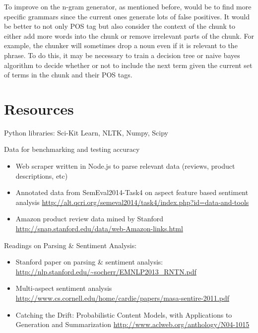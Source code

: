 \documentclass{article}
\begin{document}
To improve on the n-gram generator, as mentioned before, would be to find more specific grammars since the current ones generate lots of false positives. It would be better to not only POS tag but also consider the context of the chunk to either add more words into the chunk or remove irrelevant parts of the chunk. For example, the chunker will sometimes drop a noun even if it is relevant to the phrase. To do this, it may be necessary to train a decision tree or naive bayes algorithm to decide whether or not to include the next term given the current set of terms in the chunk and their POS tags. 

\section{Resources}

Python libraries: Sci-Kit Learn, NLTK, Numpy, Scipy

Data for benchmarking and testing accuracy

\begin{itemize}
\item Web scraper written in Node.js to parse relevant data (reviews, product descriptions, etc)
\newline 

\item Annotated data from SemEval2014-Task4 on aspect feature based sentiment analysis
\newline
\url{http://alt.qcri.org/semeval2014/task4/index.php?id=data-and-tools}

\item Amazon product review data mined by Stanford
\newline
\url{http://snap.stanford.edu/data/web-Amazon-links.html}
\end{itemize}

Readings on Parsing \& Sentiment Analysis:
\begin{itemize}
\item Stanford paper on parsing \& sentiment analysis:
\newline
\url{http://nlp.stanford.edu/~socherr/EMNLP2013_RNTN.pdf}

\item Multi-aspect sentiment analysis
\newline 
\url{http://www.cs.cornell.edu/home/cardie/papers/masa-sentire-2011.pdf}

\item Catching the Drift: Probabilistic Content Models, with Applications to
Generation and Summarization \newline
\url{http://www.aclweb.org/anthology/N04-1015}

\end{itemize}
\end{document}
